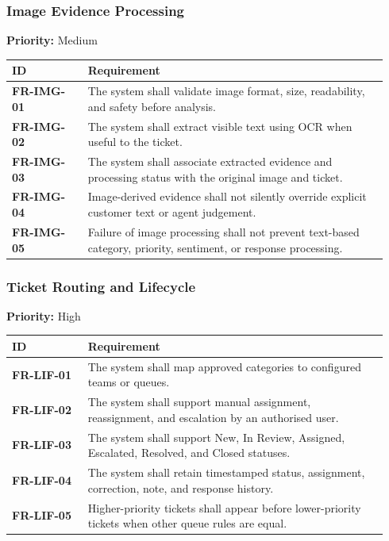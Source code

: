 \documentclass[10pt,letterpaper]{article}
\newcommand{\req}[1]{\textbf{#1}}
\newcommand{\priority}[1]{\textbf{Priority:} #1}
\newenvironment{requirements}{%
  \small\setlength{\tabcolsep}{4pt}%
  \begin{longtable}{|L{0.19\linewidth}|L{0.75\linewidth}|}
  \hline\textbf{ID} & \textbf{Requirement}\\\hline\endhead}{\hline\end{longtable}}
\newenvironment{templatebody}{\par\justifying\setlength{\emergencystretch}{3em}}{\par}
\begin{document}
\begin{templatebody}
\subsubsection{Image Evidence Processing}
\priority{Medium}
\begin{requirements}
\req{FR-IMG-01} & The system shall validate image format, size, readability, and safety before analysis.\\
\req{FR-IMG-02} & The system shall extract visible text using OCR when useful to the ticket.\\
\req{FR-IMG-03} & The system shall associate extracted evidence and processing status with the original image and ticket.\\
\req{FR-IMG-04} & Image-derived evidence shall not silently override explicit customer text or agent judgement.\\
\req{FR-IMG-05} & Failure of image processing shall not prevent text-based category, priority, sentiment, or response processing.\\
\end{requirements}

\subsubsection{Ticket Routing and Lifecycle}
\priority{High}
\begin{requirements}
\req{FR-LIF-01} & The system shall map approved categories to configured teams or queues.\\
\req{FR-LIF-02} & The system shall support manual assignment, reassignment, and escalation by an authorised user.\\
\req{FR-LIF-03} & The system shall support New, In Review, Assigned, Escalated, Resolved, and Closed statuses.\\
\req{FR-LIF-04} & The system shall retain timestamped status, assignment, correction, note, and response history.\\
\req{FR-LIF-05} & Higher-priority tickets shall appear before lower-priority tickets when other queue rules are equal.\\
\end{requirements}


\end{templatebody}
\end{document}
